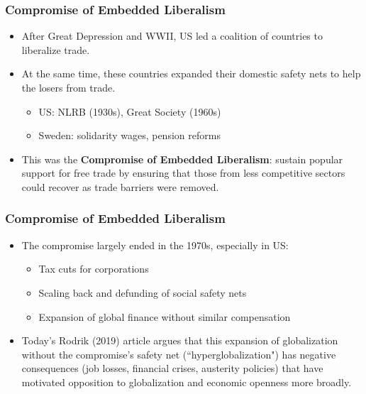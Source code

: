 \documentclass{beamer}
\begin{document}
\begin{frame} 
	\frametitle{\LARGE Compromise of Embedded Liberalism}
	\begin{itemize}
			\item After Great Depression and WWII, US led a coalition of countries to liberalize trade. \pause 
			\item At the same time, these countries expanded their domestic safety nets to help the losers from trade. \pause 
			\begin{itemize}
				\item US: NLRB (1930s), Great Society (1960s) \pause
				\item Sweden: solidarity wages, pension reforms \pause 
			\end{itemize}
		\item This was the \textbf{Compromise of Embedded Liberalism}: sustain popular support for free trade by ensuring that those from less competitive sectors could recover as trade barriers were removed.
	\end{itemize}
\end{frame}

\begin{frame} 
	\frametitle{\LARGE Compromise of Embedded Liberalism}
	\begin{itemize}
		\item The compromise largely ended in the 1970s, especially in US: \pause 
		\begin{itemize}
			\item Tax cuts for corporations \pause 
			\item Scaling back and defunding of social safety nets \pause
			\item Expansion of global finance without similar compensation \pause
		\end{itemize}
		\item Today's Rodrik (2019) article argues that this expansion of globalization without the compromise's safety net (``hyperglobalization") has negative consequences (job losses, financial crises, austerity policies) that have motivated opposition to globalization and economic openness more broadly.
	\end{itemize}
\end{frame}
\end{document}

